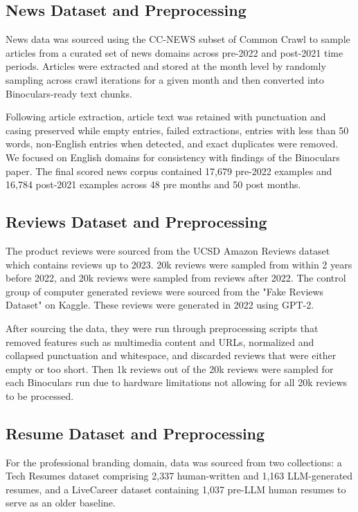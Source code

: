 \documentclass[11pt]{article}
\begin{document}
\subsection{News Dataset and Preprocessing}
News data was sourced using the CC-NEWS subset of Common Crawl to sample articles from a curated set of news domains across pre-2022 and post-2021 time periods. Articles were extracted and stored at the month level by randomly sampling across crawl iterations for a given month and then converted into Binoculars-ready text chunks.

Following article extraction, article text was retained with punctuation and casing preserved while empty entries, failed extractions, entries with less than 50 words, non-English entries when detected, and exact duplicates were removed. We focused on English domains for consistency with findings of the Binoculars paper. The final scored news corpus contained 17,679 pre-2022 examples and 16,784 post-2021 examples across 48 pre months and 50 post months.

\subsection{Reviews Dataset and Preprocessing}
The product reviews were sourced from the UCSD Amazon Reviews dataset which contains reviews up to 2023. 20k reviews were sampled from within 2 years before 2022, and 20k reviews were sampled from reviews after 2022. The control group of computer generated reviews were sourced from the "Fake Reviews Dataset" on Kaggle. These reviews were generated in 2022 using GPT-2.

After sourcing the data, they were run through preprocessing scripts that removed features such as multimedia content and URLs, normalized and collapsed punctuation and whitespace, and discarded reviews that were either empty or too short. Then 1k reviews out of the 20k reviews were sampled for each Binoculars run due to hardware limitations not allowing for all 20k reviews to be processed.

\subsection{Resume Dataset and Preprocessing}
For the professional branding domain, data was sourced from two collections: a Tech Resumes dataset comprising 2,337 human-written and 1,163 LLM-generated resumes, and a LiveCareer dataset containing 1,037 pre-LLM human resumes to serve as an older baseline. 
\end{document}
